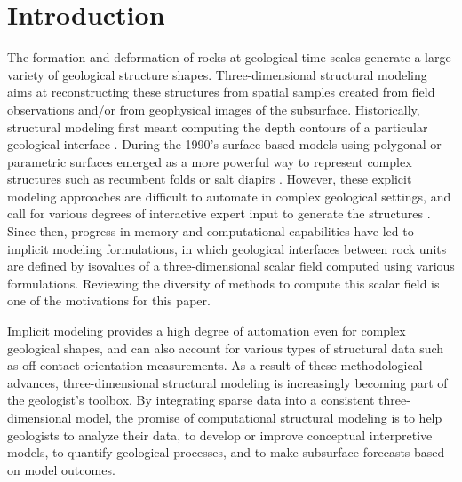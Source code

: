 \documentclass[preprint]{ring20}
\begin{document}

\section*{Introduction}

The formation and deformation of rocks at geological time scales generate a large variety of geological structure shapes. Three-dimensional structural modeling aims at reconstructing these structures from spatial samples created from field observations and/or from geophysical images of the subsurface. Historically, structural modeling first meant computing the depth contours of a particular geological interface \citep[e.g.,][]{Walters1969AB,Hardy1971JGR,Briggs1974G,Bolondi1976G}. During the 1990's surface-based models using polygonal or parametric surfaces emerged as a more powerful way to represent complex structures such as recumbent folds or salt diapirs \citep{Mallet1992CD,deKemp1999CG}. However, these explicit modeling approaches are difficult to automate in complex geological settings, and call for various degrees of interactive expert input to generate the structures \citep{Collon2016I}. Since then, progress in memory and computational capabilities have led to implicit modeling formulations, in which geological interfaces between rock units are defined by isovalues of a three-dimensional scalar field computed using various formulations\citep[][]{Lajaunie1997MG,Cowan2002ASGMEM,Calcagno2008PEPI,Frank2007CG,Caumon2013GaRSITo,Souche20137ECEISE2,Hillier2014MG,Laurent2016MG,Laurent2016EaPSL,Martin2017CG,Grose2017JSG,delaVarga2018GMDD,Grose2019JoSG,Renaudeau2019BEMRMX,Renaudeau2019MG,Manchuk2019CG,Grose2021GMDa,Irakarama2021MG,Hillier2021MG,Goncalves2021C&G,Irakarama2022CD,Pizzella2022MG,Bi2022GMD}. Reviewing the diversity of methods to compute this scalar field is one of the motivations for this paper.  

Implicit modeling provides a high degree of automation even for complex geological shapes, and can also account for various types of structural data such as off-contact orientation  measurements. As a result of these methodological advances, three-dimensional structural modeling is increasingly becoming part of the geologist's toolbox. By integrating sparse data into a consistent three-dimensional model, the promise of computational structural modeling is to help geologists to analyze their data, to develop or improve conceptual interpretive models, to quantify geological processes, and to make subsurface forecasts based on model outcomes. 
\end{document}
